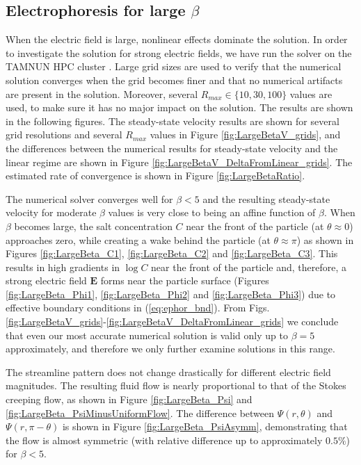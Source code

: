 \documentclass[MSc,beforeExam]{iitcsthesis}
\newcommand\bE{\boldsymbol{E}}
\begin{document}
\subsection{Electrophoresis for large $\beta$ }
When the electric field is large, nonlinear effects dominate the solution.
In order to investigate the solution for strong electric fields, 
we have run the solver on the TAMNUN HPC cluster \cite{tamnun}.
Large grid sizes are used to verify that the numerical solution converges when the grid becomes finer and that no numerical artifacts are present in the solution.
Moreover, several $R_{max} \in \{10, 30, 100\}$ values are used, to make sure it has no major impact on the solution.
The results are shown in the following figures. 
The steady-state velocity results are shown for several grid resolutions and several $R_{max}$ values in Figure \ref{fig:LargeBetaV_grids}, and the differences between the numerical results for
steady-state velocity and the linear regime are shown in Figure \ref{fig:LargeBetaV_DeltaFromLinear_grids}.
The estimated rate of convergence is shown in Figure \ref{fig:LargeBetaRatio}.

The numerical solver converges well for $\beta < 5$ and the resulting steady-state velocity 
for moderate $\beta$ values is very close to being an affine function of $\beta$.
When $\beta$ becomes large, the salt concentration $C$ near the front of the particle 
(at $\theta \approx 0$) approaches zero, while creating a wake behind the particle 
(at $\theta \approx \pi$) as shown in Figures \ref{fig:LargeBeta_C1}, \ref{fig:LargeBeta_C2} and
\ref{fig:LargeBeta_C3}.
This results in high gradients in $\log C$ near the front of the particle  and, therefore, a strong electric field $\bE$ forms near the particle surface (Figures \ref{fig:LargeBeta_Phi1}, \ref{fig:LargeBeta_Phi2} and \ref{fig:LargeBeta_Phi3}) due to effective boundary conditions in (\ref{eq:ephor_bnd}). 
From Figs. \ref{fig:LargeBetaV_grids}-\ref{fig:LargeBetaV_DeltaFromLinear_grids} we conclude that even our most accurate numerical solution is valid only up to $\beta = 5$ approximately, and therefore we only further examine solutions in this range.

The streamline pattern does not change drastically for different electric field magnitudes. 
The resulting fluid flow is nearly proportional to that of the Stokes creeping flow, 
as shown in Figure \ref{fig:LargeBeta_Psi} and \ref{fig:LargeBeta_PsiMinusUniformFlow}. 
The difference between $\Psi(r, \theta)$ and $\Psi(r, \pi-\theta)$ is shown in Figure \ref{fig:LargeBeta_PsiAsymm}, demonstrating that the flow is almost symmetric (with relative
difference up to approximately $0.5\%$) for $\beta < 5$.
\end{document}

